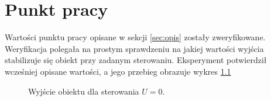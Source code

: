\chapter{Punkt pracy}
Wartości punktu pracy opisane w sekcji \ref{sec:opis} zostały
zweryfikowane. Weryfikacja polegała na prostym sprawdzeniu na jakiej
wartości wyjścia stabilizuje się obiekt przy zadanym sterowaniu.
Eksperyment potwierdził wcześniej opisane wartości, a jego przebieg
obrazuje wykres \ref{fig:pkt_prac}

\begin{figure}[tb]
\centering
{}
\caption{Wyjście obiektu dla sterowania $U = 0$.}
\label{fig:pkt_prac}
\end{figure}